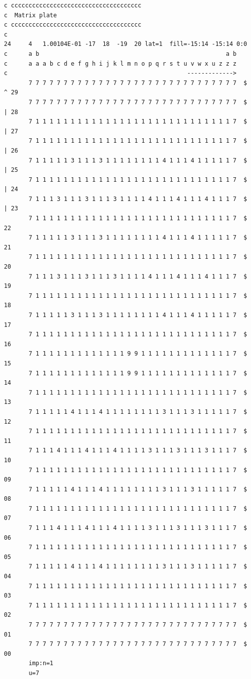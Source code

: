 \documentclass[
	12pt,				%
	openany,			%
	twoside,			%
	a4paper,			%
	english,			%
	french,				%
	spanish,			%
	brazil				%
	]{abntex2}
\begin{document}
\begin{anexosenv}
\begin{itemize}
\begin{lstlisting}
c ccccccccccccccccccccccccccccccccccccc
c  Matrix plate  
c ccccccccccccccccccccccccccccccccccccc
c
24     4   1.00104E-01 -17  18  -19  20 lat=1  fill=-15:14 -15:14 0:0 
c      a b                                                     a b    
c      a a a b c d e f g h i j k l m n o p q r s t u v w x u z z z
c                                                   -------------> 
       7 7 7 7 7 7 7 7 7 7 7 7 7 7 7 7 7 7 7 7 7 7 7 7 7 7 7 7 7 7  $ ^ 29    
       7 7 7 7 7 7 7 7 7 7 7 7 7 7 7 7 7 7 7 7 7 7 7 7 7 7 7 7 7 7  $ | 28    
       7 1 1 1 1 1 1 1 1 1 1 1 1 1 1 1 1 1 1 1 1 1 1 1 1 1 1 1 1 7  $ | 27    
       7 1 1 1 1 1 1 1 1 1 1 1 1 1 1 1 1 1 1 1 1 1 1 1 1 1 1 1 1 7  $ | 26    
       7 1 1 1 1 1 3 1 1 1 3 1 1 1 1 1 1 1 1 4 1 1 1 4 1 1 1 1 1 7  $ | 25    
       7 1 1 1 1 1 1 1 1 1 1 1 1 1 1 1 1 1 1 1 1 1 1 1 1 1 1 1 1 7  $ | 24    
       7 1 1 1 3 1 1 1 3 1 1 1 3 1 1 1 1 4 1 1 1 4 1 1 1 4 1 1 1 7  $ | 23    
       7 1 1 1 1 1 1 1 1 1 1 1 1 1 1 1 1 1 1 1 1 1 1 1 1 1 1 1 1 7  $   22    
       7 1 1 1 1 1 3 1 1 1 3 1 1 1 1 1 1 1 1 4 1 1 1 4 1 1 1 1 1 7  $   21    
       7 1 1 1 1 1 1 1 1 1 1 1 1 1 1 1 1 1 1 1 1 1 1 1 1 1 1 1 1 7  $   20    
       7 1 1 1 3 1 1 1 3 1 1 1 3 1 1 1 1 4 1 1 1 4 1 1 1 4 1 1 1 7  $   19    
       7 1 1 1 1 1 1 1 1 1 1 1 1 1 1 1 1 1 1 1 1 1 1 1 1 1 1 1 1 7  $   18    
       7 1 1 1 1 1 3 1 1 1 3 1 1 1 1 1 1 1 1 4 1 1 1 4 1 1 1 1 1 7  $   17    
       7 1 1 1 1 1 1 1 1 1 1 1 1 1 1 1 1 1 1 1 1 1 1 1 1 1 1 1 1 7  $   16    
       7 1 1 1 1 1 1 1 1 1 1 1 1 1 9 9 1 1 1 1 1 1 1 1 1 1 1 1 1 7  $   15    
       7 1 1 1 1 1 1 1 1 1 1 1 1 1 9 9 1 1 1 1 1 1 1 1 1 1 1 1 1 7  $   14    
       7 1 1 1 1 1 1 1 1 1 1 1 1 1 1 1 1 1 1 1 1 1 1 1 1 1 1 1 1 7  $   13    
       7 1 1 1 1 1 4 1 1 1 4 1 1 1 1 1 1 1 1 3 1 1 1 3 1 1 1 1 1 7  $   12    
       7 1 1 1 1 1 1 1 1 1 1 1 1 1 1 1 1 1 1 1 1 1 1 1 1 1 1 1 1 7  $   11    
       7 1 1 1 4 1 1 1 4 1 1 1 4 1 1 1 1 3 1 1 1 3 1 1 1 3 1 1 1 7  $   10    
       7 1 1 1 1 1 1 1 1 1 1 1 1 1 1 1 1 1 1 1 1 1 1 1 1 1 1 1 1 7  $   09    
       7 1 1 1 1 1 4 1 1 1 4 1 1 1 1 1 1 1 1 3 1 1 1 3 1 1 1 1 1 7  $   08    
       7 1 1 1 1 1 1 1 1 1 1 1 1 1 1 1 1 1 1 1 1 1 1 1 1 1 1 1 1 7  $   07    
       7 1 1 1 4 1 1 1 4 1 1 1 4 1 1 1 1 3 1 1 1 3 1 1 1 3 1 1 1 7  $   06    
       7 1 1 1 1 1 1 1 1 1 1 1 1 1 1 1 1 1 1 1 1 1 1 1 1 1 1 1 1 7  $   05    
       7 1 1 1 1 1 4 1 1 1 4 1 1 1 1 1 1 1 1 3 1 1 1 3 1 1 1 1 1 7  $   04    
       7 1 1 1 1 1 1 1 1 1 1 1 1 1 1 1 1 1 1 1 1 1 1 1 1 1 1 1 1 7  $   03    
       7 1 1 1 1 1 1 1 1 1 1 1 1 1 1 1 1 1 1 1 1 1 1 1 1 1 1 1 1 7  $   02    
       7 7 7 7 7 7 7 7 7 7 7 7 7 7 7 7 7 7 7 7 7 7 7 7 7 7 7 7 7 7  $   01     
       7 7 7 7 7 7 7 7 7 7 7 7 7 7 7 7 7 7 7 7 7 7 7 7 7 7 7 7 7 7  $   00       
       imp:n=1
       u=7


\end{lstlisting}
\end{itemize}
\end{anexosenv}
\end{document}
